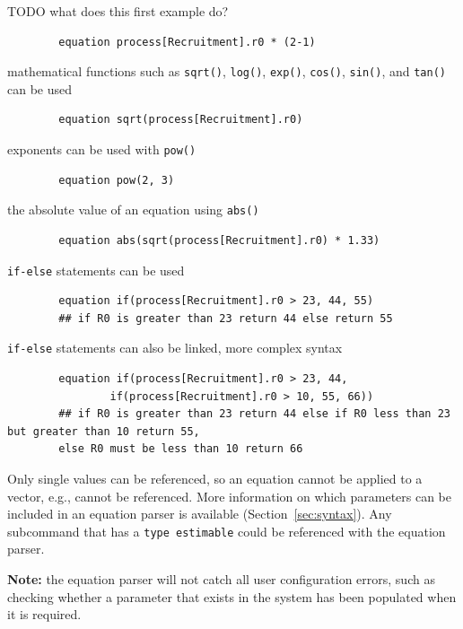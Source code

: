 TODO what does this first example do?

{\small{\begin{verbatim}
		equation process[Recruitment].r0 * (2-1)
		\end{verbatim}}}

mathematical functions such as \texttt{sqrt()}, \texttt{log()},  \texttt{exp()},  \texttt{cos()}, \texttt{sin()}, and \texttt{tan()} can be used

{\small{\begin{verbatim}
		equation sqrt(process[Recruitment].r0)
		\end{verbatim}}}

exponents can be used with \texttt{pow()}

{\small{\begin{verbatim}
		equation pow(2, 3)
		\end{verbatim}}}

the absolute value of an equation using \texttt{abs()}

{\small{\begin{verbatim}
		equation abs(sqrt(process[Recruitment].r0) * 1.33)
		\end{verbatim}}}

\texttt{if-else} statements can be used

{\small{\begin{verbatim}
		equation if(process[Recruitment].r0 > 23, 44, 55)
		## if R0 is greater than 23 return 44 else return 55
		\end{verbatim}}}

\texttt{if-else} statements can also be linked, more complex syntax

{\small{\begin{verbatim}
		equation if(process[Recruitment].r0 > 23, 44,
         		if(process[Recruitment].r0 > 10, 55, 66))
		## if R0 is greater than 23 return 44 else if R0 less than 23 but greater than 10 return 55,
		else R0 must be less than 10 return 66
		\end{verbatim}}}

Only single values can be referenced, so an equation cannot be applied to a vector, e.g.,  cannot be referenced. More information on which parameters can be included in an equation parser is available (Section~\ref{sec:syntax}). Any subcommand that has a \texttt{type estimable} could be referenced with the equation parser.

\textbf{Note:} the equation parser will not catch all user configuration errors, such as checking whether a parameter that exists in the system has been populated when it is required.

